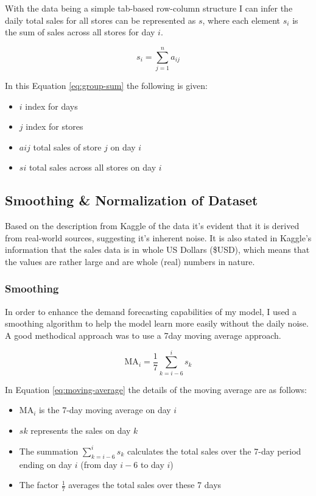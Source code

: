 \documentclass[10pt, journal, letterpaper, compsoc]{IEEEtran}
\begin{document}
With the data being a simple tab-based row-column structure I can infer the daily total sales for all stores can be represented as $s$, where each element $s_i$ is the sum of sales across all stores for day $i$.

\begin{equation}
s_i = \sum_{j=1}^{n} a_{ij}
\label{eq:group-sum}
\end{equation}

In this Equation \ref{eq:group-sum} the following is given:
\begin{itemize}
    \item $i$ index for days
    \item $j$ index for stores
    \item $aij$ total sales of store $j$ on day $i$
    \item $si$ total sales across all stores on day $i$
\end{itemize}


\subsection{Smoothing \& Normalization of Dataset}
Based on the description from Kaggle\cite{demand-forecasting-kernels-only} of the data it's evident that it is derived from real-world sources, suggesting it's inherent noise. It is also stated in Kaggle's information that the sales data is in whole US Dollars (\$USD), which means that the values are rather large and are whole (real) numbers in nature.


\subsubsection{Smoothing}
In order to enhance the demand forecasting capabilities of my model, I used a smoothing algorithm to help the model learn more easily without the daily noise. A good methodical approach was to use a 7day moving average approach.

\begin{equation}
\text{MA}_i = \frac{1}{7} \sum_{k=i-6}^{i} s_k
\label{eq:moving-average}
\end{equation}

In Equation \ref{eq:moving-average} the details of the moving average are as follows:
\begin{itemize}
    \item $\text{MA}_i$ is the 7-day moving average on day $i$
    \item $sk$ represents the sales on day $k$
    \item The summation $\sum_{k=i-6}^{i} s_k$ calculates the total sales over the 7-day period ending on day $i$ (from day $i-6$ to day $i$)
    \item The factor $\frac{1}{7}$ averages the total sales over these 7 days
\end{itemize}
\end{document}
